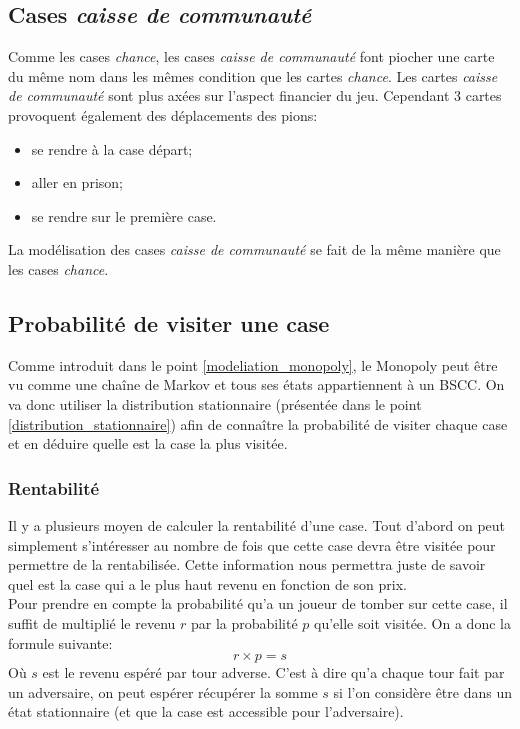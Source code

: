 \documentclass[letterpaper]{article}
\begin{document}
  \subsection{Cases \textit{caisse de communauté}}
    Comme les cases \textit{chance}, les cases \textit{caisse de
    communauté} font piocher une carte du même nom dans les mêmes
    condition que les cartes \textit{chance}.  Les cartes
    \textit{caisse de communauté} sont plus axées sur l'aspect
    financier du jeu. Cependant 3 cartes provoquent également des
    déplacements des pions:
    \begin{itemize}
     \item se rendre à la case départ;
     \item aller en prison;
     \item se rendre sur le première case.
    \end{itemize}
    La modélisation des cases \textit{caisse de communauté} se fait de la
    même manière que les cases \textit{chance}.

  \subsection{Probabilité de visiter une case}
    Comme introduit dans le point \ref{modeliation_monopoly}, le Monopoly
    peut être vu comme une chaîne de Markov et tous ses états appartiennent 
    à un BSCC.  On va donc utiliser la distribution stationnaire (présentée dans
    le point \ref{distribution_stationnaire}) afin de connaître la
    probabilité de visiter chaque case et en déduire quelle est la case la
    plus visitée.

  \subsubsection{Rentabilité}
    \label{rentabilite}
    Il y a plusieurs moyen de calculer la rentabilité d'une case.  Tout
    d'abord on peut simplement s'intéresser au nombre de fois que cette case
    devra être visitée pour permettre de la rentabilisée.  Cette information
    nous permettra juste de savoir quel est la case qui a le plus haut revenu en
    fonction de son prix.\\
    Pour prendre en compte la probabilité qu'a un joueur de tomber sur cette
    case, il suffit de multiplié le revenu $r$ par la probabilité $p$ qu'elle soit
    visitée.  On a donc la formule suivante:
    $$r \times p = s$$
    Où $s$ est le revenu espéré par tour adverse.  C'est à dire qu'a chaque tour
    fait par un adversaire, on peut espérer récupérer la somme $s$ si l'on
    considère être dans un état stationnaire (et que la case est accessible
    pour l'adversaire).
\end{document}
